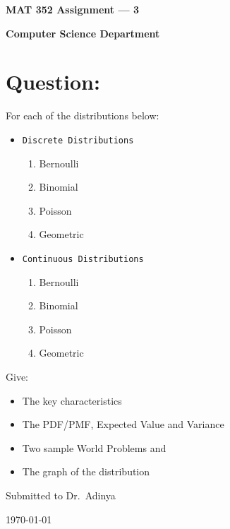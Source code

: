\documentclass[a4paper]{article}
\begin{document}
    \begin{titlepage}

        \begin{center}
            \vspace*{1cm}

            \Huge
            \textbf{MAT 352 Assignment --- 3}

            \vspace{1.5cm}

            \textbf{Computer Science Department}

            \vspace{1cm}
            \Large
            \raggedright{
                \section*{Question:}
                For each of the distributions below:
                \begin{itemize}
                    \item \texttt{Discrete Distributions}
                        \begin{enumerate}
                            \item{Bernoulli}
                            \item{Binomial}
                            \item{Poisson}
                            \item{Geometric}
                        \end{enumerate}
                    \item \texttt{Continuous Distributions}
                        \begin{enumerate}
                            \item{Bernoulli}
                            \item{Binomial}
                            \item{Poisson}
                            \item{Geometric}
                        \end{enumerate}
                \end{itemize}
                Give:
                \begin{itemize}
                    \item{The key characteristics}
                    \item{The PDF/PMF, Expected Value and Variance}
                    \item{Two sample World Problems and}
                    \item{The graph of the distribution}
                \end{itemize}
            }

            \vspace{2cm}
            \centering
            \large
            Submitted to Dr.\ Adinya

            \vspace{1cm}
            \today
            \normalsize
        \end{center}

    \end{titlepage}
\end{document}
